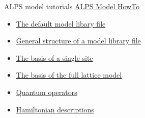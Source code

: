 \begin{frame}[t,fragile]{ALPS model tutorials}
  \href{http://alps.comp-phys.org/mediawiki/index.php/Tutorials:ModelHOWTO}{ALPS Model HowTo} \\
  \begin{itemize}
  \item \href{http://alps.comp-phys.org/mediawiki/index.php/Tutorials:ModelHOWTO#The_default_model_libary_file}{The default model libary file}
  \item \href{http://alps.comp-phys.org/mediawiki/index.php/Tutorials:ModelHOWTO#General_structure_of_a_model_library_file}{General structure of a model library file}
  \item \href{http://alps.comp-phys.org/mediawiki/index.php/Tutorials:ModelHOWTO#The_basis_of_a_single_site}{The basis of a single site}
  \item \href{http://alps.comp-phys.org/mediawiki/index.php/Tutorials:ModelHOWTO#The_basis_of_the_full_lattice_model}{The basis of the full lattice model}
  \item \href{http://alps.comp-phys.org/mediawiki/index.php/Tutorials:ModelHOWTO#Quantum_operators}{Quantum operators}
  \item \href{http://alps.comp-phys.org/mediawiki/index.php/Tutorials:ModelHOWTO#Hamiltonian_descriptions}{Hamiltonian descriptions}
  \end{itemize}
\end{frame}


